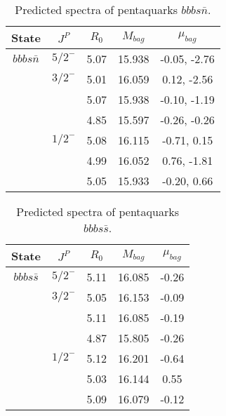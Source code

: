 \documentclass[prd,twocolumn,floatfix,nofootinbib]{revtex4}
\begin{document}
\renewcommand{\tabcolsep}{0.5cm}
\renewcommand{\arraystretch}{1.2}
\begin{table*}[!htbp]
    \caption{Predicted spectra of pentaquarks $bbbs\bar{n}$.}
    \begin{tabular}{ccccc}
        \hline\hline
        {\rm State} &$J^{P}$ &$R_{0}$ &$M_{bag}$ &$\mu_{bag}$ \\ \hline
        ${bbbs\bar{n}}$
            &${5/2}^{-}$    &5.07   &15.938 &-0.05, -2.76 \\
            &${3/2}^{-}$    &5.01   &16.059 &0.12, -2.56 \\ 
            &               &5.07   &15.938 &-0.10, -1.19 \\
            &               &4.85   &15.597 &-0.26, -0.26 \\
            &${1/2}^{-}$    &5.08   &16.115 &-0.71, 0.15 \\
            &               &4.99   &16.052 &0.76, -1.81 \\
            &               &5.05   &15.933 &-0.20, 0.66 \\
        \hline\hline
    \end{tabular}
\end{table*}

\renewcommand{\tabcolsep}{0.5cm}
\renewcommand{\arraystretch}{1.2}
\begin{table*}[!htbp]
    \caption{Predicted spectra of pentaquarks $bbbs\bar{s}$.}
    \begin{tabular}{ccccc}
        \hline\hline
        {\rm State} &$J^{P}$ &$R_{0}$ &$M_{bag}$ &$\mu_{bag}$ \\ \hline
        ${bbbs\bar{s}}$
            &${5/2}^{-}$    &5.11   &16.085 &-0.26 \\
            &${3/2}^{-}$    &5.05   &16.153 &-0.09 \\
            &               &5.11   &16.085 &-0.19 \\
            &               &4.87   &15.805 &-0.26 \\
            &${1/2}^{-}$    &5.12   &16.201 &-0.64 \\
            &               &5.03   &16.144 &0.55 \\
            &               &5.09   &16.079 &-0.12 \\
        \hline\hline
    \end{tabular}
\end{table*}
\end{document}
